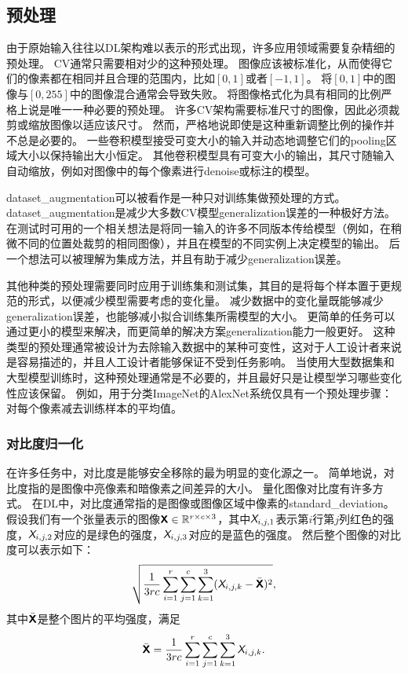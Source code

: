 \subsection{预处理}
\label{sec:preprocessing}

由于原始输入往往以\gls{DL}架构难以表示的形式出现，许多应用领域需要复杂精细的预处理。
\gls{CV}通常只需要相对少的这种预处理。
图像应该被标准化，从而使得它们的像素都在相同并且合理的范围内，比如$[0,1]$或者$[-1,1]$。
将$[0,1]$中的图像与$[0,255]$中的图像混合通常会导致失败。
将图像格式化为具有相同的比例严格上说是唯一一种必要的预处理。
许多\gls{CV}架构需要标准尺寸的图像，因此必须裁剪或缩放图像以适应该尺寸。
然而，严格地说即使是这种重新调整比例的操作并不总是必要的。
一些卷积模型接受可变大小的输入并动态地调整它们的\gls{pooling}区域大小以保持输出大小恒定\citep{Waibel89b}。
其他卷积模型具有可变大小的输出，其尺寸随输入自动缩放，例如对图像中的每个像素进行\gls{denoise}或标注的模型\citep{Hadsell-RSS-07}。

\gls{dataset_augmentation}可以被看作是一种只对训练集做预处理的方式。
\gls{dataset_augmentation}是减少大多数\gls{CV}模型\gls{generalization}误差的一种极好方法。
在测试时可用的一个相关想法是将同一输入的许多不同版本传给模型（例如，在稍微不同的位置处裁剪的相同图像），并且在模型的不同实例上决定模型的输出。
后一个想法可以被理解为集成方法，并且有助于减少\gls{generalization}误差。

其他种类的预处理需要同时应用于训练集和测试集，其目的是将每个样本置于更规范的形式，以便减少模型需要考虑的变化量。
减少数据中的变化量既能够减少\gls{generalization}误差，也能够减小拟合训练集所需模型的大小。
更简单的任务可以通过更小的模型来解决，而更简单的解决方案\gls{generalization}能力一般更好。
这种类型的预处理通常被设计为去除输入数据中的某种可变性，这对于人工设计者来说是容易描述的，并且人工设计者能够保证不受到任务影响。
当使用大型数据集和大型模型训练时，这种预处理通常是不必要的，并且最好只是让模型学习哪些变化性应该保留。
例如，用于分类ImageNet的AlexNet系统仅具有一个预处理步骤：对每个像素减去训练样本的平均值\citep{Krizhevsky-2012}。

\subsubsection{对比度归一化}
\label{sec:contrast_normalization}


在许多任务中，对比度是能够安全移除的最为明显的变化源之一。
简单地说，对比度指的是图像中亮像素和暗像素之间差异的大小。
量化图像对比度有许多方式。
在\gls{DL}中，对比度通常指的是图像或图像区域中像素的\gls{standard_deviation}。
假设我们有一个张量表示的图像$\textsf{\textbf{X}} \in\mathbb{R}^{r\times c\times 3}$，其中$\textit{\textsf{X}}_{i,j,1}$表示第$i$行第$j$列红色的强度，$\textit{\textsf{X}}_{i,j,2}$对应的是绿色的强度，$\textit{\textsf{X}}_{i,j,3}$对应的是蓝色的强度。
然后整个图像的对比度可以表示如下：
\begin{align}
\label{eqn:121}
\sqrt{\frac{1}{3rc}\sum_{i=1}^{r} \sum_{j=1}^{c}\sum_{k=1}^{3} (\textit{\textsf{X}}_{i,j,k} - \bar{\textsf{\textbf{X}}} )^2},
\end{align}
其中$\bar{\textsf{\textbf{X}}}$是整个图片的平均强度，满足
\begin{align}
\label{eqn:122}
 \bar{\textsf{\textbf{X}}} =  \frac{1}{3rc}\sum_{i=1}^{r} \sum_{j=1}^{c}\sum_{k=1}^{3}\textit{\textsf{X}}_{i,j,k}.
\end{align}


